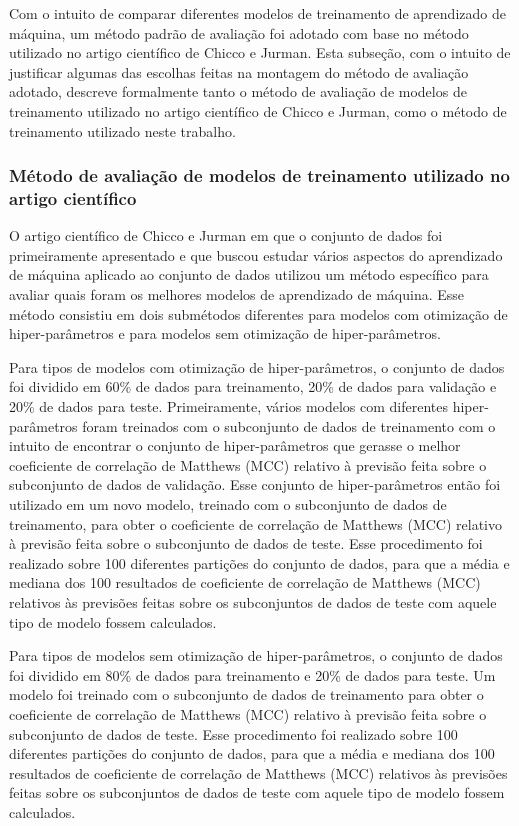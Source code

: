 Com o intuito de comparar diferentes modelos de treinamento de aprendizado de máquina, um método padrão de avaliação foi adotado com base no método utilizado no artigo científico de Chicco e Jurman\cite{chicco2020}. Esta subseção, com o intuito de justificar algumas das escolhas feitas na montagem do método de avaliação adotado, descreve formalmente tanto o método de avaliação de modelos de treinamento utilizado no artigo científico de Chicco e Jurman, como o método de treinamento utilizado neste trabalho.

\subsubsection{Método de avaliação de modelos de treinamento utilizado no artigo científico}

O artigo científico de Chicco e Jurman em que o conjunto de dados\cite{larxel_dataset} foi primeiramente apresentado e que buscou estudar vários aspectos do aprendizado de máquina aplicado ao conjunto de dados utilizou um método específico para avaliar quais foram os melhores modelos de aprendizado de máquina. Esse método consistiu em dois submétodos diferentes para modelos com otimização de hiper-parâmetros e para modelos sem otimização de hiper-parâmetros.

Para tipos de modelos com otimização de hiper-parâmetros, o conjunto de dados foi dividido em 60\% de dados para treinamento, 20\% de dados para validação e 20\% de dados para teste. Primeiramente, vários modelos com diferentes hiper-parâmetros foram treinados com o subconjunto de dados de treinamento com o intuito de encontrar o conjunto de hiper-parâmetros que gerasse o melhor coeficiente de correlação de Matthews (MCC) relativo à previsão feita sobre o subconjunto de dados de validação. Esse conjunto de hiper-parâmetros então foi utilizado em um novo modelo, treinado com o subconjunto de dados de treinamento, para obter o coeficiente de correlação de Matthews (MCC) relativo à previsão feita sobre o subconjunto de dados de teste. Esse procedimento foi realizado sobre 100 diferentes partições do conjunto de dados, para que a média e mediana dos 100 resultados de coeficiente de correlação de Matthews (MCC) relativos às previsões feitas sobre os subconjuntos de dados de teste com aquele tipo de modelo fossem calculados.

Para tipos de modelos sem otimização de hiper-parâmetros, o conjunto de dados foi dividido em 80\% de dados para treinamento e 20\% de dados para teste. Um modelo foi treinado com o subconjunto de dados de treinamento para obter o coeficiente de correlação de Matthews (MCC) relativo à previsão feita sobre o subconjunto de dados de teste. Esse procedimento foi realizado sobre 100 diferentes partições do conjunto de dados, para que a média e mediana dos 100 resultados de coeficiente de correlação de Matthews (MCC) relativos às previsões feitas sobre os subconjuntos de dados de teste com aquele tipo de modelo fossem calculados.

